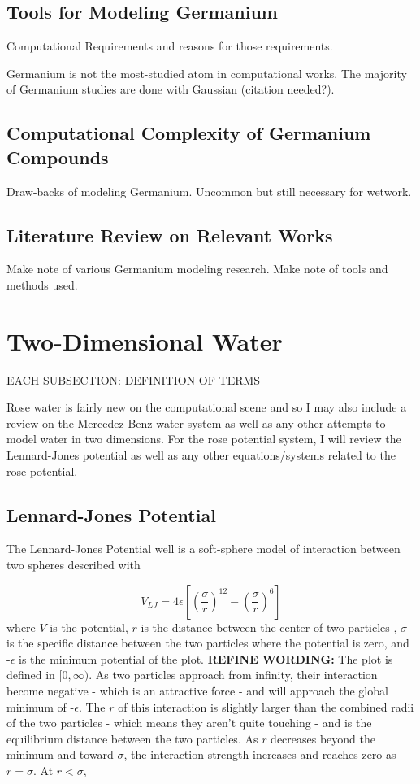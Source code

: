 \subsection{Tools for Modeling Germanium}

Computational Requirements and reasons for those requirements.

Germanium is not the most-studied atom in computational works.
The majority of Germanium studies are done with Gaussian (citation needed?).

\subsection{Computational Complexity of Germanium Compounds}

Draw-backs of modeling Germanium. Uncommon but still necessary for wetwork.

\subsection{Literature Review on Relevant Works}

Make note of various Germanium modeling research. Make note of tools and methods used.

\section{Two-Dimensional Water}

EACH SUBSECTION: DEFINITION OF TERMS

Rose water is fairly new on the computational scene and so I may also include a review on the Mercedez-Benz water system as well as any other attempts to model water in two dimensions. For the rose potential system, I will review the Lennard-Jones potential  as well as any other equations/systems related to the rose potential.

\subsection{Lennard-Jones Potential}

The Lennard-Jones Potential well is a soft-sphere model of interaction  between two spheres described with

\begin{equation}
V_{LJ} = 4\epsilon[(\frac{\sigma}{r})^{12} - (\frac{\sigma}{r})^{6}]
\end{equation}
where $V$ is the potential, $r$ is the distance between the center of two particles , $\sigma$ is the specific distance between the two particles where the potential is zero, and -$\epsilon$ is the minimum potential of the plot.
\textbf{REFINE WORDING:}
The plot is defined in $[0,\infty)$.
As two particles approach from infinity, their interaction become negative - which is an attractive force - and will approach the global minimum of -$\epsilon$.
The $r$ of this interaction is slightly larger than the combined radii of the two particles - which means they aren't quite touching - and is the equilibrium distance between the two particles.
As $r$ decreases beyond the minimum and toward $\sigma$, the interaction strength increases and reaches zero as $r = \sigma$.
At $r < \sigma$, 

